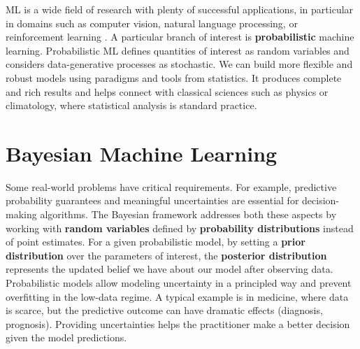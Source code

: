 

\ifpdf
    \graphicspath{{chapters/1_introduction/figures/}}
\else
    \graphicspath{{1_introduction/figures/EPS/}{1_introduction/figures/}}
\fi

\ac{ML} is a wide field of research with plenty of successful applications, in particular in domains such as computer vision, natural language processing, or reinforcement learning \cite{jordan2015machine}.
A particular branch of interest is \textbf{probabilistic} machine learning.
Probabilistic \ac{ML} defines quantities of interest as random variables and considers data-generative processes as stochastic.
We can build more flexible and robust models using paradigms and tools from statistics.
It produces complete and rich results and helps connect with classical sciences such as physics or climatology, where statistical analysis is standard practice.

\section{Bayesian Machine Learning}

Some real-world problems have critical requirements.
For example, predictive probability guarantees  and meaningful uncertainties are essential for decision-making algorithms.
The Bayesian framework addresses both these aspects by working with \textbf{random variables} defined by \textbf{probability distributions} instead of point estimates.
For a given probabilistic model, by setting a \textbf{prior distribution} over the parameters of interest, the \textbf{posterior distribution} represents the updated belief we have about our model after observing data.
Probabilistic models allow modeling uncertainty in a principled way and prevent overfitting in the low-data regime.
A typical example is in medicine, where data is scarce, but the predictive outcome can have dramatic effects (diagnosis, prognosis).
Providing uncertainties helps the practitioner make a better decision given the model predictions.

